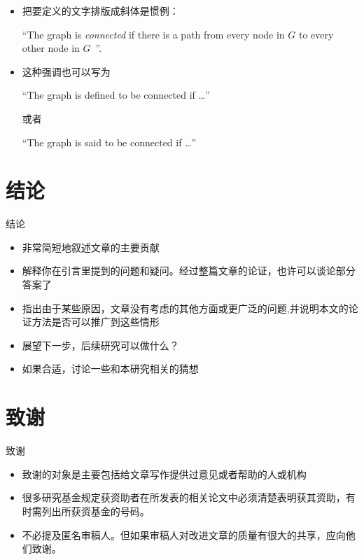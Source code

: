 \documentclass[13pt]{ctexbeamer}
\begin{document}
\begin{frame}
\begin{itemize}
\item 把要定义的文字排版成斜体是惯例：

``The graph is \emph{connected} {if}  there is a path from every node in $G$ to every other node in $G$~''.

\item 这种强调也可以写为

``The graph is defined to be {connected} {if}  \dots''

或者

``The graph is said to be {connected} {if}  \dots''
\end{itemize}

\end{frame}



\section{结论}
\begin{frame}{结论}
	
	\begin{itemize}
		\item  非常简短地叙述文章的主要贡献
		\item  解释你在引言里提到的问题和疑问。经过整篇文章的论证，也许可以谈论部分答案了
		\item 指出由于某些原因，文章没有考虑的其他方面或更广泛的问题,并说明本文的论证方法是否可以推广到这些情形
		\item  展望下一步，后续研究可以做什么？
		\item 如果合适，讨论一些和本研究相关的猜想
	\end{itemize}
\end{frame}

\section{致谢}
\begin{frame}{致谢}
	
	\begin{itemize}
		\item  致谢的对象是主要包括给文章写作提供过意见或者帮助的人或机构
		\item  很多研究基金规定获资助者在所发表的\alert{相关}论文中必须清楚表明获其资助，有时需列出所获资基金的号码。
		\item 不必提及匿名审稿人。但如果审稿人对改进文章的质量有很大的共享，应向他们致谢。
	\end{itemize}
\end{frame}
\end{document}

